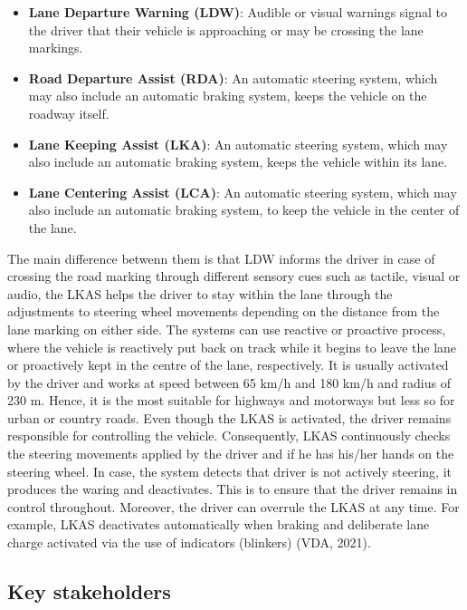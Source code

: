 \documentclass[
]{book}
\providecommand{\tightlist}{%
  \setlength{\itemsep}{0pt}\setlength{\parskip}{0pt}}
\begin{document}
\begin{itemize}
\tightlist
\item
  \textbf{Lane Departure Warning (LDW)}: Audible or visual warnings signal to the driver that their vehicle is approaching or may be crossing the lane markings.
\item
  \textbf{Road Departure Assist (RDA)}: An automatic steering system, which may also include an automatic braking system, keeps the vehicle on the roadway itself.
\item
  \textbf{Lane Keeping Assist (LKA)}: An automatic steering system, which may also include an automatic braking system, keeps the vehicle within its lane.
\item
  \textbf{Lane Centering Assist (LCA)}: An automatic steering system, which may also include an automatic braking system, to keep the vehicle in the center of the lane.
\end{itemize}

The main difference betwenn them is that LDW informs the driver in case of crossing the road marking through different sensory cues such as tactile, visual or audio, the LKAS helps the driver to stay within the lane through the adjustments to steering wheel movements depending on the distance from the lane marking on either side. The systems can use reactive or proactive process, where the vehicle is reactively put back on track while it begins to leave the lane or proactively kept in the centre of the lane, respectively. It is usually activated by the driver and works at speed between 65 km/h and 180 km/h and radius of 230 m. Hence, it is the most suitable for highways and motorways but less so for urban or country roads. Even though the LKAS is activated, the driver remains responsible for controlling the vehicle. Consequently, LKAS continuously checks the steering movements applied by the driver and if he has his/her hands on the steering wheel. In case, the system detects that driver is not actively steering, it produces the waring and deactivates. This is to ensure that the driver remains in control throughout. Moreover, the driver can overrule the LKAS at any time. For example, LKAS deactivates automatically when braking and deliberate lane charge activated via the use of indicators (blinkers) (VDA, 2021).

\hypertarget{key-stakeholders-19}{%
\subsection*{Key stakeholders}\label{key-stakeholders-19}}
\end{document}

